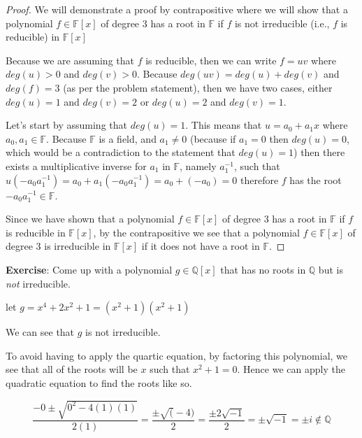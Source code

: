 \documentclass[a4paper]{article}
\begin{document}
\begin{myparindent}{0pt}
\begin{proof}
  We will demonstrate a proof by contrapositive where we will show that a
  polynomial $f \in \mathbb{F}[x]$ of degree 3 has
  a root in $\mathbb{F}$ if $f$ is not irreducible (i.e., $f$ is reducible) in
  $\mathbb{F}[x]$
  \newline

  Because we are assuming that $f$ is reducible, then we can write $f = uv$
  where $deg(u) > 0$ and $deg(v) > 0$. Because $deg(uv) = deg(u) + deg(v)$ and
  $deg(f) = 3$ (as per the problem statement), then we have two cases, either
  $deg(u) = 1$ and $deg(v) = 2$ or $deg(u) = 2$ and $deg(v) = 1$. \newline

  Let's start by assuming that $deg(u) = 1$. This means that $u = a_0 + a_1x$
  where $a_0, a_1 \in \mathbb{F}$. Because $\mathbb{F}$ is a field, and
  $a_1 \neq 0$ (because if $a_1 = 0$ then $deg(u) = 0$, which would be a
  contradiction to the statement that $deg(u) = 1$)
  then there
  exists a multiplicative inverse for $a_1$ in $\mathbb{F}$, namely
  $a_1^{-1}$, such that $u(-a_0a_1^{-1}) = a_0 + a_1(-a_0a_1^{-1}) = a_0 + (-a_0) = 0$
  therefore $f$ has the root $-a_0a_1^{-1} \in \mathbb{F}$. \newline

  Since we have shown that a polynomial $f \in \mathbb{F}[x]$ of degree 3 has a
  root in $\mathbb{F}$ if $f$ is reducible in $\mathbb{F}[x]$, by the
  contrapositive we see that a polynomial $f \in \mathbb{F}[x]$ of degree 3 is
  irreducible in $\mathbb{F}[x]$ if it does not have a root in $\mathbb{F}$.
\end{proof}

\textbf{Exercise}:
Come up with a polynomial $g \in \mathbb{Q}[x]$ that has no roots in $\mathbb{Q}$
but is \textit{not} irreducible. \newline

let $g = x^4 + 2x^2 + 1 = (x^2 + 1)(x^2 + 1)$ \newline

We can see that $g$ is not irreducible. \newline

To avoid having to apply the quartic equation, by factoring this polynomial, we
see that all of the roots will be $x$ such that $x^2 + 1 = 0$. Hence we can
apply the quadratic equation to find the roots like so.

\[
  \frac{-0 \pm \sqrt{0^2 - 4(1)(1)}}{2(1)} = \frac{\pm \sqrt(-4)}{2} =
  \frac{\pm 2 \sqrt{-1}}{2} = \pm \sqrt{-1} = \pm i \notin \mathbb{Q}
\]


\end{myparindent}
\end{document}
